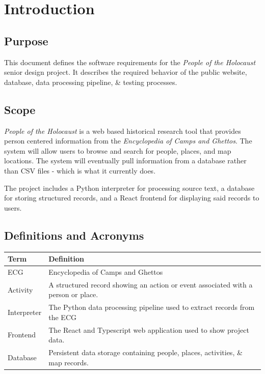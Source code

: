 \section{Introduction}

\subsection{Purpose}
This document defines the software requirements for the \textit{People of the Holocaust} senior design project. It describes the required behavior of the public website, database, data processing pipeline, \& testing processes.

\subsection{Scope}
\textit{People of the Holocaust} is a web based historical research tool that provides person centered information from the \textit{Encyclopedia of Camps and Ghettos}. The system will allow users to browse and search for people, places, and map locations. The system will eventually pull information from a database rather than CSV files - which is what it currently does.

The project includes a Python interpreter for processing source text, a database for storing structured records, and a React frontend for displaying said records to users.

\subsection{Definitions and Acronyms}

\begin{longtable}{|p{}|p{}|}
	\hline
	\textbf{Term} & \textbf{Definition}                                                               \\
	\hline
	ECG           & Encyclopedia of Camps and Ghettos                                                 \\
	\hline
	Activity      & A structured record showing an action or event associated with a person or place. \\
	\hline
	Interpreter   & The Python data processing pipeline used to extract records from the ECG          \\
	\hline
	Frontend      & The React and Typescript web application used to show project data.               \\
	\hline
	Database      & Persistent data storage containing people, places, activities, \& map records.    \\
	\hline
\end{longtable}

